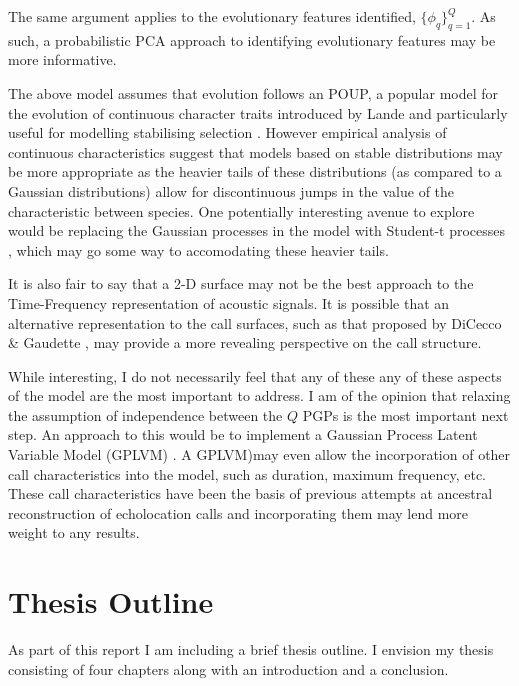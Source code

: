\documentclass[]{article}
\begin{document}
The same argument applies to the evolutionary features identified, \(\{\phi_q\}_{q = 1}^{Q}\). As such, a probabilistic PCA \cite{tipping1999probabilistic} approach to identifying evolutionary features may be more informative.

The above model assumes that evolution follows an POUP, a popular model for the evolution of continuous character traits introduced by Lande \cite{lande1976natural} and particularly useful for modelling stabilising selection \cite{hansen1997stabilizing}. However empirical analysis of continuous characteristics suggest that models based on stable distributions may be more appropriate \cite{elliot2014inferring} as the heavier tails of these distributions (as compared to a Gaussian distributions) allow for discontinuous jumps in the value of the characteristic between species. One potentially interesting  avenue to explore would be replacing the Gaussian processes in the model with Student-t processes \cite{shah2014student}, which may go some way to accomodating these heavier tails.

It is also fair to say that a 2-D surface may not be the best approach to the Time-Frequency representation of acoustic signals. It is possible that an alternative representation to the call surfaces, such as that proposed by DiCecco \& Gaudette \cite{dicecco2013multi}, may provide a more revealing perspective on the call structure.

While interesting, I do not necessarily feel that any of these any of these aspects of the model are the most important to address. I am of the opinion that relaxing the assumption of independence between the \(Q\) PGPs is the most important next step. An approach to this would be to implement a Gaussian Process Latent Variable Model (GPLVM) \cite{li2016review} \cite{krauth2016autogp}. A GPLVM)may even allow the incorporation of other call characteristics into the model, such as duration, maximum frequency, etc. These call characteristics have been the basis of previous attempts at ancestral reconstruction of echolocation calls \cite{collen2012evolution} and incorporating them may lend more weight to any results.


\section{Thesis Outline}

As part of this report I am including a brief thesis outline. I envision my thesis consisting of four chapters along with an introduction and a conclusion.
\end{document}
